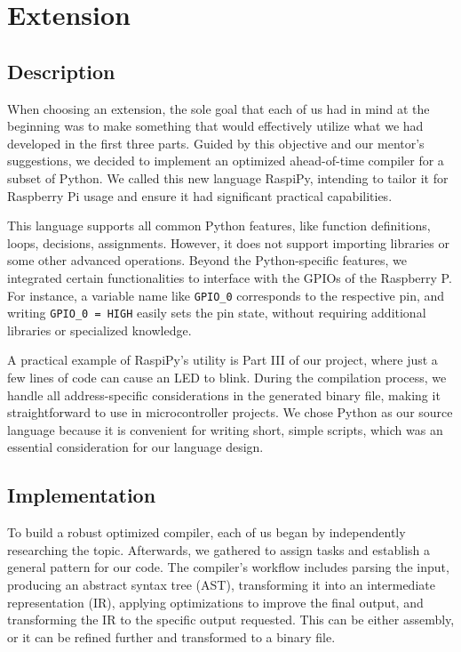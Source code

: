 \documentclass{article}
\begin{document}
\section{Extension}

\subsection{Description}

When choosing an extension, the sole goal that each of us had in mind at the beginning was to make something that would effectively utilize what we had developed in the first three parts. Guided by this objective and our mentor's suggestions, we decided to implement an optimized ahead-of-time compiler for a subset of Python. We called this new language RaspiPy, intending to tailor it for Raspberry Pi usage and ensure it had significant practical capabilities.

This language supports all common Python features, like function definitions, loops, decisions, assignments. However, it does not support importing libraries or some other advanced operations. Beyond the Python-specific features, we integrated certain functionalities to interface with the GPIOs of the Raspberry P. For instance, a variable name like \texttt{GPIO\_0} corresponds to the respective pin, and writing \texttt{GPIO\_0 = HIGH} easily sets the pin state, without requiring additional libraries or specialized knowledge.

A practical example of RaspiPy's utility is Part III of our project, where just a few lines of code can cause an LED to blink. During the compilation process, we handle all address-specific considerations in the generated binary file, making it straightforward to use in microcontroller projects. We chose Python as our source language because it is convenient for writing short, simple scripts, which was an essential consideration for our language design.

\subsection{Implementation}

To build a robust optimized compiler, each of us began by independently researching the topic. Afterwards, we gathered to assign tasks and establish a general pattern for our code. The compiler's workflow includes parsing the input, producing an abstract syntax tree (AST), transforming it into an intermediate representation (IR), applying optimizations to improve the final output, and transforming the IR to the specific output requested. This can be either assembly, or it can be refined further and transformed to a binary file.
\end{document}
